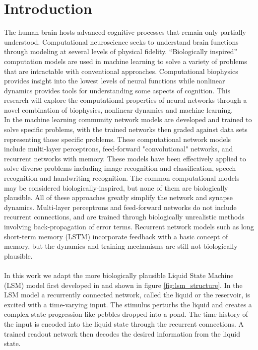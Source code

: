 \documentclass[a4paper,11pt]{article}
\begin{document}
\section{Introduction} 
 The human brain hosts advanced cognitive processes that remain only partially understood.
Computational neuroscience seeks to understand brain functions through modeling at several levels of physical fidelity.
``Biologically inspired'' computation models are used in machine learning to solve a variety of problems that are intractable with conventional approaches.
Computational biophysics provides insight into the lowest levels of neural functions while nonlinear dynamics provides tools for understanding some aspects of cognition.
This research will explore the computational properties of neural networks through a novel combination of biophysics, nonlinear dynamics and machine learning.
\\
In the machine learning community network models are developed and trained to solve specific problems, with the trained networks then graded against data sets representing those specific problems.
These computational network models include multi-layer perceptrons, feed-forward "convolutional" networks, and recurrent networks with memory.
These models have been effectively applied to solve diverse problems including image recognition and classification, speech recognition and handwriting recognition.
The common computational models may be considered biologically-inspired, but none of them are biologically plausible.
All of these approaches greatly simplify the network and synapse dynamics.
Multi-layer perceptrons and feed-forward networks do not include recurrent connections, and are trained through biologically unrealistic methods involving back-propagation of error terms.
Recurrent network models such as long short-term memory (LSTM)  incorporate feedback with a basic concept of memory, but the dynamics and training mechanisms are still not biologically plausible.
\\ \\
In this work we adapt the more biologically plausible Liquid State Machine (LSM) model first developed in \cite{maas2002} and shown in figure \ref{fig:lsm_structure}.
In the LSM model a recurrently connected network, called the liquid or the reservoir, is excited with a time-varying input.
The stimulus perturbs the liquid and creates a complex state progression like pebbles dropped into a pond.
The time history of the input is encoded into the liquid state through the recurrent connections.
A trained readout network then decodes the desired information from the liquid state. 
\end{document}
